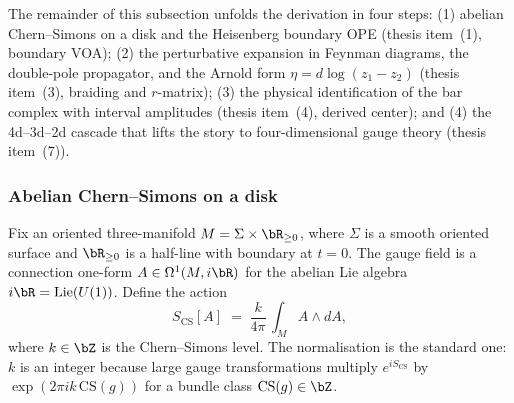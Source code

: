 The remainder of this subsection unfolds the derivation in four
steps: (1) abelian Chern--Simons on a disk and the Heisenberg
boundary OPE (thesis item~(1), boundary VOA); (2) the perturbative
expansion in Feynman diagrams, the double-pole propagator, and the
Arnold form $\eta = d\log(z_1 - z_2)$ (thesis item~(3), braiding
and $r$-matrix); (3) the physical identification of the bar complex
with interval amplitudes (thesis item~(4), derived center); and
(4) the 4d--3d--2d cascade that lifts the story to
four-dimensional gauge theory (thesis item~(7)).

\subsubsection{Abelian Chern--Simons on a disk}
\label{sec:cs-hinge-abelian}

Fix an oriented three-manifold $M = \Sigma \times \bR_{\ge 0}$,
where $\Sigma$ is a smooth oriented surface and $\bR_{\ge 0}$ is a
half-line with boundary at $t = 0$. The gauge field is a
connection one-form $A \in \Omega^1(M, i\bR)$ for the abelian Lie
algebra $i\bR = \mathrm{Lie}(U(1))$. Define the action
\begin{equation}\label{eq:cs-hinge-action}
S_{\mathrm{CS}}[A]
\;=\;
\frac{k}{4\pi}\,
\int_M A \wedge dA,
\end{equation}
where $k \in \bZ$ is the Chern--Simons level. The normalisation is
the standard one: $k$ is an integer because large gauge
transformations multiply $e^{iS_{\mathrm{CS}}}$ by
$\exp(2\pi i k\, \mathrm{CS}(g))$ for a bundle class
$\mathrm{CS}(g) \in \bZ$.

